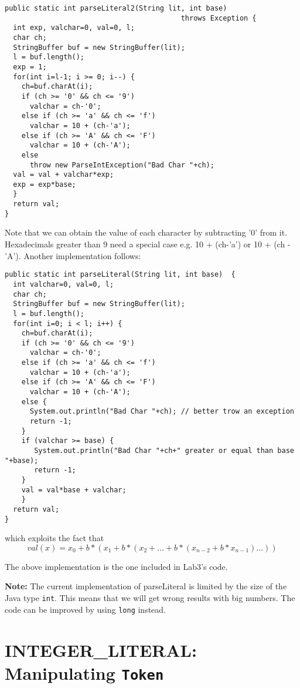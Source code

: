 \documentclass{article}
\begin{document}
\begin{verbatim}
public static int parseLiteral2(String lit, int base) 
                                          throws Exception {
  int exp, valchar=0, val=0, l;
  char ch; 
  StringBuffer buf = new StringBuffer(lit);
  l = buf.length();
  exp = 1;
  for(int i=l-1; i >= 0; i--) {
    ch=buf.charAt(i);
    if (ch >= '0' && ch <= '9')
      valchar = ch-'0';
    else if (ch >= 'a' && ch <= 'f')
      valchar = 10 + (ch-'a');
    else if (ch >= 'A' && ch <= 'F')
      valchar = 10 + (ch-'A');
    else
      throw new ParseIntException("Bad Char "+ch);
  val = val + valchar*exp;
  exp = exp*base;
  }
  return val;
}	
\end{verbatim}


Note that we can obtain the value of each character by subtracting '0' from it. Hexadecimals greater than 9 need a special case e.g.  10 + (ch-'a') or 10 + (ch - 'A'). Another implementation follows:

\begin{verbatim}
public static int parseLiteral(String lit, int base)  {
  int valchar=0, val=0, l;
  char ch; 
  StringBuffer buf = new StringBuffer(lit);
  l = buf.length();	    
  for(int i=0; i < l; i++) {
    ch=buf.charAt(i);		
    if (ch >= '0' && ch <= '9')		    
      valchar = ch-'0';
    else if (ch >= 'a' && ch <= 'f')		    
      valchar = 10 + (ch-'a');		
    else if (ch >= 'A' && ch <= 'F')		    
      valchar = 10 + (ch-'A');
    else {
      System.out.println("Bad Char "+ch); // better trow an exception
      return -1;
    }		
    if (valchar >= base) {		   
       System.out.println("Bad Char "+ch+" greater or equal than base "+base);  
       return -1;
    }	
    val = val*base + valchar;	    
    }	    
  return val;	
}
\end{verbatim}

which exploits the fact that 
$$\mathit{val}(x) = x_0+b*(x_1+b*(x_2+\ldots+b*(x_{n-2}+b*x_{n-1})\ldots))
$$ 

The above implementation is the one included in Lab3's code.

\textbf{Note:} The current implementation of parseLiteral is limited by the size of the Java type {\tt int}. This means that we will get wrong results with big numbers. The code can be improved by using {\tt long} instead. 

\section{INTEGER\_LITERAL: Manipulating {\tt Token}}
\end{document}
